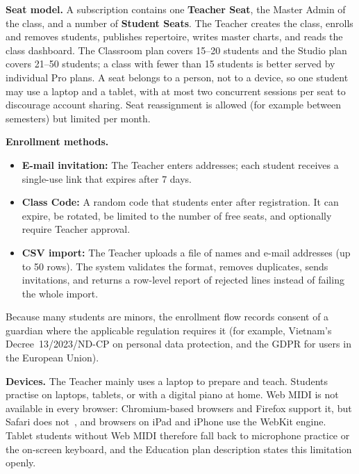 \documentclass[a4paper]{article}
\begin{document}
\textbf{Seat model.} A subscription contains one \textbf{Teacher Seat}, the Master Admin of the class, and a number of \textbf{Student Seats}. The Teacher creates the class, enrolls and removes students, publishes repertoire, writes master charts, and reads the class dashboard. The Classroom plan covers 15--20 students and the Studio plan covers 21--50 students; a class with fewer than 15 students is better served by individual Pro plans. A seat belongs to a person, not to a device, so one student may use a laptop and a tablet, with at most two concurrent sessions per seat to discourage account sharing. Seat reassignment is allowed (for example between semesters) but limited per month.

\textbf{Enrollment methods.}
\begin{itemize}
    \item \textbf{E-mail invitation:} The Teacher enters addresses; each student receives a single-use link that expires after 7 days.
    \item \textbf{Class Code:} A random code that students enter after registration. It can expire, be rotated, be limited to the number of free seats, and optionally require Teacher approval.
    \item \textbf{CSV import:} The Teacher uploads a file of names and e-mail addresses (up to 50 rows). The system validates the format, removes duplicates, sends invitations, and returns a row-level report of rejected lines instead of failing the whole import.
\end{itemize}
Because many students are minors, the enrollment flow records consent of a guardian where the applicable regulation requires it (for example, Vietnam's Decree~13/2023/ND-CP on personal data protection, and the GDPR for users in the European Union).

\textbf{Devices.} The Teacher mainly uses a laptop to prepare and teach. Students practise on laptops, tablets, or with a digital piano at home. Web MIDI is not available in every browser: Chromium-based browsers and Firefox support it, but Safari does not~\cite{chrome_webmidi}, and browsers on iPad and iPhone use the WebKit engine. Tablet students without Web MIDI therefore fall back to microphone practice or the on-screen keyboard, and the Education plan description states this limitation openly.
\end{document}
